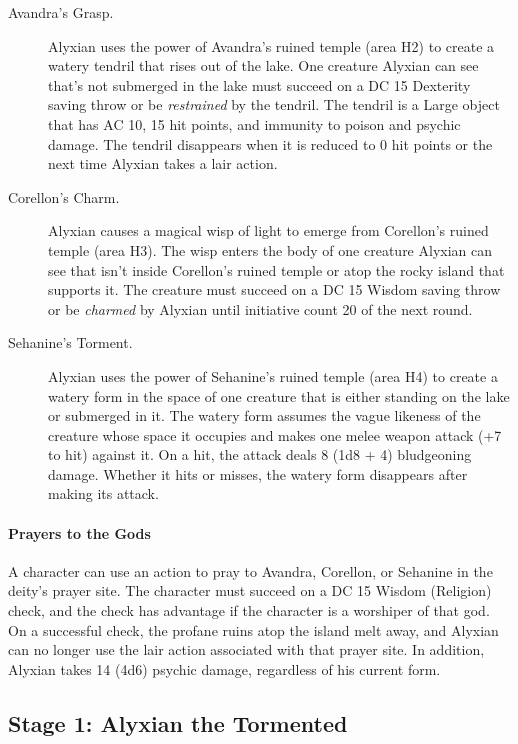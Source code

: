 \documentclass[a4paper, 11pt, bg=full, twocolumn, nooutline]{dndbook}
\begin{document}
\begin{description}
\item[Avandra's Grasp.] Alyxian uses the power of Avandra's ruined temple (area H2) to create a watery tendril that rises out of the lake. One creature Alyxian can see that's not submerged in the lake must succeed on a DC 15 Dexterity saving throw or be \textit{restrained} by the tendril. The tendril is a Large object that has AC 10, 15 hit points, and immunity to poison and psychic damage. The tendril disappears when it is reduced to 0 hit points or the next time Alyxian takes a lair action.
\item[Corellon's Charm.] Alyxian causes a magical wisp of light to emerge from Corellon's ruined temple (area H3). The wisp enters the body of one creature Alyxian can see that isn't inside Corellon's ruined temple or atop the rocky island that supports it. The creature must succeed on a DC 15 Wisdom saving throw or be \textit{charmed} by Alyxian until initiative count 20 of the next round.
\item[Sehanine's Torment.] Alyxian uses the power of Sehanine's ruined temple (area H4) to create a watery form in the space of one creature that is either standing on the lake or submerged in it. The watery form assumes the vague likeness of the creature whose space it occupies and makes one melee weapon attack (+7 to hit) against it. On a hit, the attack deals 8 (1d8 + 4) bludgeoning damage. Whether it hits or misses, the watery form disappears after making its attack.
\end{description}

\paragraph{Prayers to the Gods}

A character can use an action to pray to Avandra, Corellon, or Sehanine in the deity's prayer site. The character must succeed on a DC 15 Wisdom (Religion) check, and the check has advantage if the character is a worshiper of that god. On a successful check, the profane ruins atop the island melt away, and Alyxian can no longer use the lair action associated with that prayer site. In addition, Alyxian takes 14 (4d6) psychic damage, regardless of his current form.


\subsection{Stage 1: Alyxian the Tormented}
\end{document}

